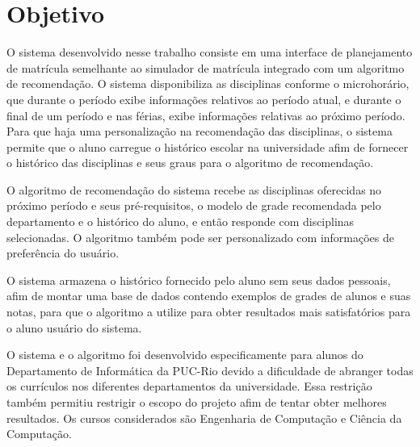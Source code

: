 \chapter{Objetivo}
\label{cha:Objetivo}


O sistema desenvolvido nesse trabalho consiste em uma interface de planejamento de matrícula semelhante ao simulador de matrícula integrado com um algoritmo de recomendação. O sistema disponibiliza as disciplinas conforme o microhorário, que durante o período exibe informações relativos ao período atual, e durante o final de um período e nas férias, exibe informações relativas ao próximo período. Para que haja uma personalização na recomendação das disciplinas, o sistema permite que o aluno carregue o histórico escolar na universidade afim de fornecer o histórico das disciplinas e seus graus para o algoritmo de recomendação.

O algoritmo de recomendação do sistema recebe as disciplinas oferecidas no próximo período e seus pré-requisitos, o modelo de grade recomendada pelo departamento e o histórico do aluno, e então responde com disciplinas selecionadas. O algoritmo também pode ser personalizado com informações de preferência do usuário.

O sistema armazena o histórico fornecido pelo aluno sem seus dados pessoais, afim de montar uma base de dados contendo exemplos de grades de alunos e suas notas, para que o algoritmo a utilize para obter resultados mais satisfatórios para o aluno usuário do sistema.

O sistema e o algoritmo foi desenvolvido especificamente para alunos do Departamento de Informática da PUC-Rio devido a dificuldade de abranger todas os currículos nos diferentes departamentos da universidade. Essa restrição também permitiu restrigir o escopo do projeto afim de tentar obter melhores resultados. Os cursos considerados são Engenharia de Computação e Ciência da Computação.




